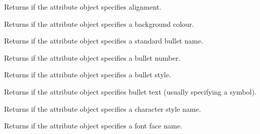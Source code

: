 
Returns \true if the attribute object specifies alignment.

\label{wxrichtextattrhasbackgroundcolour}


Returns \true if the attribute object specifies a background colour.

\label{wxrichtextattrhasbulletname}


Returns \true if the attribute object specifies a standard bullet name.

\label{wxrichtextattrhasbulletnumber}


Returns \true if the attribute object specifies a bullet number.

\label{wxrichtextattrhasbulletstyle}


Returns \true if the attribute object specifies a bullet style.

\label{wxrichtextattrhasbullettext}


Returns \true if the attribute object specifies bullet text (usually specifying a symbol).

\label{wxrichtextattrhascharacterstylename}


Returns \true if the attribute object specifies a character style name.

\label{wxrichtextattrhasfacename}


Returns \true if the attribute object specifies a font face name.

\label{wxrichtextattrhasflag}


